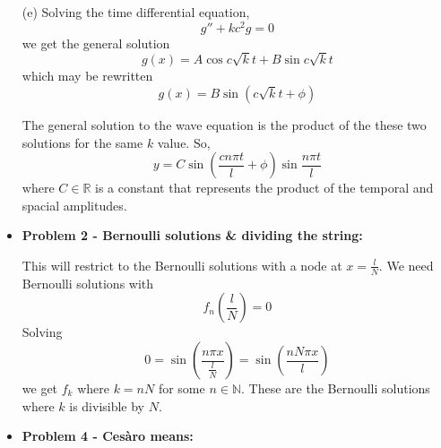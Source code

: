 \documentclass[12pt, reqno]{amsart}
\theoremstyle{definition}
\theoremstyle{remark}
\begin{document}
\begin{itemize}
\begin{itemize}
\vspace{0.1 cm}
\item[(e)] 
Solving the time differential equation, $$g''+kc^{2}g=0$$we get the general solution $$g(x)=A\cos c\sqrt{k}t+B\sin c\sqrt{k}t$$which may be rewritten $$g(x)=B\sin(c\sqrt{k}t+\phi)$$

The general solution to the wave equation is the product of the these two solutions for the same $k$ value. So, $$y=C\sin\left(\frac{cn\pi t}{l}+\phi\right)\sin\frac{n\pi t}{l}$$where $C\in \mathbb{R}$ is a constant that represents the product of the temporal and spacial amplitudes. 


\vspace{0.2 cm}
\item {\bf{Problem 2 - Bernoulli solutions \& dividing the string:}} 





This will restrict to the Bernoulli solutions with a node at $x= \frac{l}{N}$. We need Bernoulli solutions with $$f_{n}\left(\frac{l}{N}\right)=0$$Solving $$0=\sin\left(\frac{n \pi x}{\frac{l}{N}}\right)=\sin\left(\frac{nN\pi x}{l}\right)$$we get $f_k$ where $k=nN$ for some $n\in \mathbb{N}$. These are the Bernoulli solutions where $k$ is divisible by $N$.



\vspace{0.2 cm}
\item {\bf{Problem 4 - Ces\`aro means:}} 


\end{itemize}
\end{itemize}
\end{document}

